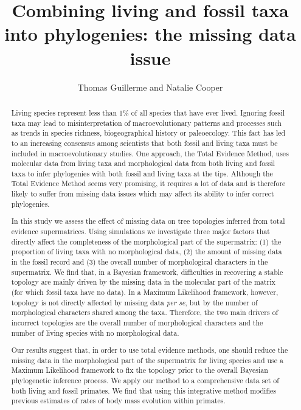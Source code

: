 \documentclass[a4paper,11pt]{article}
\title{\large{Combining living and fossil taxa into phylogenies: the missing data issue}\vspace{-2ex}}
\author{\large{Thomas Guillerme and Natalie Cooper}\vspace{-2ex}}
\date{\vspace{-3ex}}
\begin{document}
\raggedright
 \pagestyle{empty}

\maketitle

\begin{abstract}
Living species represent less than 1\% of all species that have ever lived. Ignoring fossil taxa may lead to misinterpretation of macroevolutionary patterns and processes such as trends in species richness, biogeographical history or paleoecology. This fact has led to an increasing consensus among scientists that both fossil and living taxa must be included in macroevolutionary studies. One approach, the Total Evidence Method, uses molecular data from living taxa and morphological data from both living and fossil taxa to infer phylogenies with both fossil and living taxa at the tips. Although the Total Evidence Method seems very promising, it requires a lot of data and  is therefore likely to suffer from missing data issues which may affect its ability to infer correct phylogenies.

In this study we assess the effect of missing data on tree topologies inferred from total evidence supermatrices. Using simulations we investigate three major factors that directly affect the completeness of the morphological part of the supermatrix: (1) the proportion of living taxa with no morphological data, (2) the amount of missing data in the fossil record and (3) the overall number of morphological characters in the supermatrix. We find that, in a Bayesian framework, difficulties in recovering a stable topology are mainly driven by the missing data in the molecular part of the matrix (for which fossil taxa have no data). In a Maximum Likelihood framework, however, topology is not directly affected by missing data \textit{per se}, but by the number of morphological characters shared among the taxa. Therefore, the two main drivers of incorrect topologies are the overall number of morphological characters and the number of living species with no morphological data.

Our results suggest that, in order to use total evidence methods, one should reduce the missing data in the morphological part of the supermatrix for living species and use a Maximum Likelihood framework to fix the topology prior to the overall Bayesian phylogenetic inference process. We apply our method to a comprehensive data set of both living and fossil primates. We find that using this integrative method modifies previous estimates of rates of body mass evolution within primates.

\end{abstract}
\end{document}
